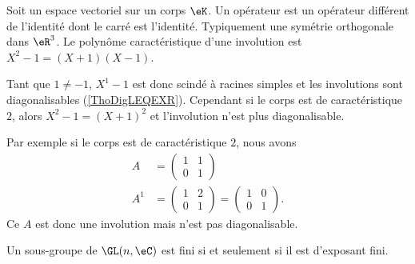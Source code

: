 \begin{example}     \label{ExewINgYo}
    Soit un espace vectoriel sur un corps \( \eK\). Un opérateur  est un opérateur différent de l'identité dont le carré est l'identité. Typiquement une symétrie orthogonale dans \( \eR^3\). Le polynôme caractéristique d'une involution est \( X^2-1=(X+1)(X-1)\).
    
    Tant que \( 1\neq -1\), \( X^1-1\) est donc scindé à racines simples et les involutions sont diagonalisables (\ref{ThoDigLEQEXR}). Cependant si le corps est de caractéristique \( 2\), alors \( X^2-1=(X+1)^2\) et l'involution n'est plus diagonalisable.

    Par exemple si le corps est de caractéristique \( 2\), nous avons
    \begin{subequations}
        \begin{align}
            A&=\begin{pmatrix}
                1    &   1    \\ 
                0    &   1    
            \end{pmatrix}\\
            A^1&=\begin{pmatrix}
                1    &   2    \\ 
                0    &   1    
            \end{pmatrix}=\begin{pmatrix}
                1    &   0    \\ 
                0    &   1    
            \end{pmatrix}.
        \end{align}
    \end{subequations}
    Ce \( A\) est donc une involution mais n'est pas diagonalisable.
\end{example}

\begin{theorem}\label{ThooJLTit}
    Un sous-groupe de \( \GL(n,\eC)\) est fini si et seulement si il est d'exposant fini.
\end{theorem}

